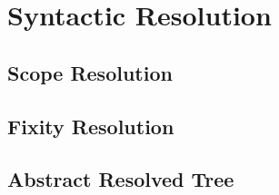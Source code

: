 \chapter{Syntactic Resolution}

\section{Scope Resolution}



\section{Fixity Resolution}

\section{Abstract Resolved Tree}
